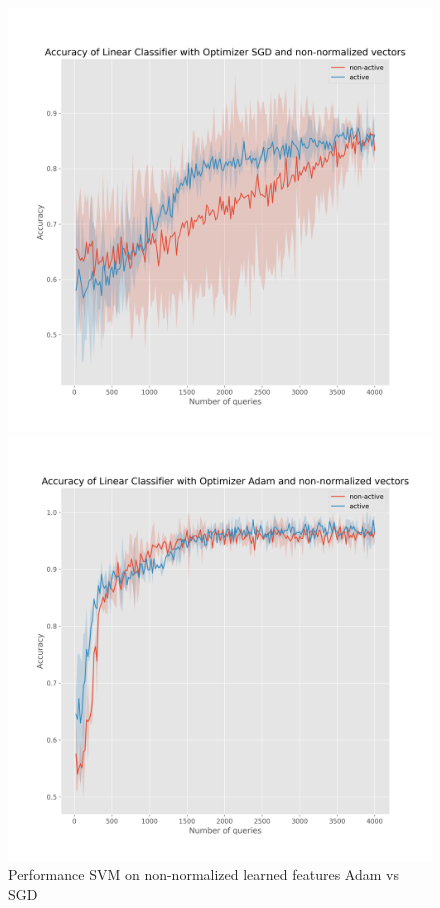 \documentclass{article}
\begin{document}
\begin{figure}[!h]
  \centering
  \begin{minipage}{.45\textwidth}
    \centering
    \includegraphics[width=\linewidth]{active-vs-base-moons-linear-loss-SGD-non-normalized-ci}
  \end{minipage}%
  \begin{minipage}{.45\textwidth}
    \centering
    \includegraphics[width=\linewidth]{active-vs-base-moons-linear-loss-Adam-non-normalized-ci}
  \end{minipage}
  \caption{Performance SVM on non-normalized learned features Adam vs SGD}\label{fig:svm-non-normalized-ci}
\end{figure}
\end{document}
